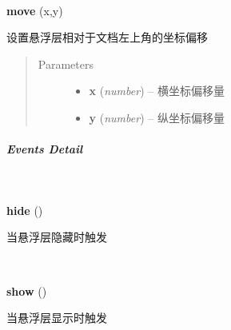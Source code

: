 \documentclass[letterpaper,10pt,english]{sphinxmanual}
\begin{document}

\begin{fulllineitems}
\label{api/component/overlay/overlay:Overlay.move}~
\begin{DUlineblock}{0em}
\item[] \textbf{move} (x,y)
\item[] 设置悬浮层相对于文档左上角的坐标偏移
\end{DUlineblock}
\begin{quote}\begin{description}
\item[{Parameters}] \leavevmode\begin{itemize}
\item {}
\textbf{x} (\emph{number}) -- 横坐标偏移量

\item {}
\textbf{y} (\emph{number}) -- 纵坐标偏移量

\end{itemize}

\end{description}\end{quote}

\end{fulllineitems}



\subparagraph{Events Detail}
\label{api/component/overlay/overlay:events-detail}

\begin{fulllineitems}
~
\begin{DUlineblock}{0em}
\item[] \textbf{hide} ()
\item[] 当悬浮层隐藏时触发
\end{DUlineblock}

\end{fulllineitems}



\begin{fulllineitems}
~
\begin{DUlineblock}{0em}
\item[] \textbf{show} ()
\item[] 当悬浮层显示时触发
\end{DUlineblock}

\end{fulllineitems}
\end{document}
